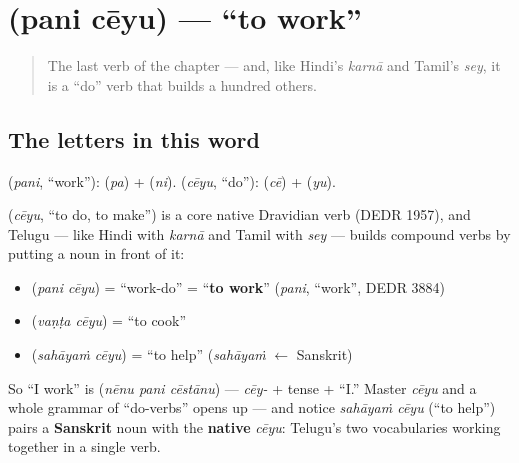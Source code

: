 \section[\texorpdfstring{\te{పని} \te{చేయు} (pani cēyu)}{పని చేయు (pani cēyu)}]{  (pani cēyu) — \textquotedblleft{}to work\textquotedblright{}}

\label{lesson:TE-C05-pani-ceyu}



\begin{quote}
The last verb of the chapter — and, like Hindi's \emph{karnā} and Tamil's \emph{sey}, it is a \textquotedblleft{}do\textquotedblright{} verb that builds a hundred others.
\end{quote}

\subsection*{The letters in this word}
\textbf{} (\emph{pani}, \textquotedblleft{}work\textquotedblright{}): \textbf{} (\emph{pa}) + \textbf{} (\emph{ni}). \textbf{} (\emph{cēyu}, \textquotedblleft{}do\textquotedblright{}): \textbf{} (\emph{cē}) + \textbf{} (\emph{yu}).

\begin{cousinweb}
\textbf{} (\emph{cēyu}, \textquotedblleft{}to do, to make\textquotedblright{}) is a core native Dravidian verb (DEDR 1957), and Telugu — like Hindi with \emph{karnā} and Tamil with \emph{sey} — builds compound verbs by putting a noun in front of it:

\begin{itemize}
\raggedright
  \item \textbf{ } (\emph{pani cēyu}) = \textquotedblleft{}work-do\textquotedblright{} = \textquotedblleft{}\textbf{to work}\textquotedblright{} (\emph{pani}, \textquotedblleft{}work\textquotedblright{}, DEDR 3884)
  \item \textbf{ } (\emph{vaṇṭa cēyu}) = \textquotedblleft{}to cook\textquotedblright{}
  \item \textbf{ } (\emph{sahāyaṁ cēyu}) = \textquotedblleft{}to help\textquotedblright{} (\emph{sahāyaṁ} $\leftarrow$ Sanskrit)
\end{itemize}

So \textquotedblleft{}I work\textquotedblright{} is \textbf{  } (\emph{nēnu pani cēstānu}) — \emph{cēy-} + tense + \textquotedblleft{}I.\textquotedblright{} Master \emph{cēyu} and a whole grammar of \textquotedblleft{}do-verbs\textquotedblright{} opens up — and notice \emph{sahāyaṁ cēyu} (\textquotedblleft{}to help\textquotedblright{}) pairs a \textbf{Sanskrit} noun with the \textbf{native} \emph{cēyu}: Telugu's two vocabularies working together in a single verb.
\end{cousinweb}

